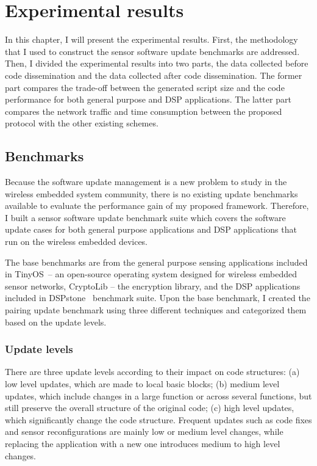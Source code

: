 \chapter{Experimental results}
In this chapter, I will present the experimental results.
First, the methodology that I used to construct the sensor software update benchmarks are addressed.
Then, I divided the experimental results into two parts,
the data collected before code dissemination and the data collected after code dissemination.
The former part compares the trade-off between the generated script size and the code performance for both general 
purpose and DSP applications.
The latter part compares the network traffic and time consumption between the proposed protocol with
the other existing schemes.

\section{Benchmarks}
Because the software update management is a new problem to study
in the wireless embedded system community, there is no existing
update benchmarks available to evaluate the performance gain
of my proposed framework.
Therefore, I built a sensor software update benchmark suite
which covers the software update cases for both general purpose
applications and DSP applications that run on the wireless
embedded devices.

The base benchmarks are from the general purpose
sensing applications included in TinyOS~\cite{tinyos}--
an open-source operating system designed for wireless embedded
sensor networks, CryptoLib -- the encryption library, and the DSP applications included in 
DSPstone~\cite{dspstone} benchmark suite. 
Upon the base benchmark, I created the pairing update benchmark
using three different techniques and categorized them based on the update levels.

\subsection{Update levels}
There are three update levels according to their
impact on code structures: 
(a) low level updates, which are made to local basic blocks; 
(b) medium level updates, which include changes in a large
function or across several functions, but still preserve the overall
structure of the original code; 
(c) high level updates, which significantly
change the code structure. Frequent updates such as code fixes and
sensor reconfigurations are mainly low or medium level changes, while
replacing the application with a new one introduces medium to high level
changes. 

